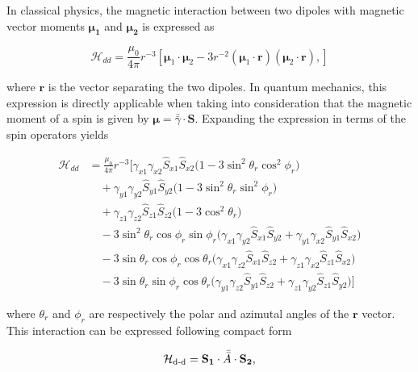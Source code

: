 In classical physics, the magnetic interaction between two dipoles with magnetic vector moments $\boldsymbol{\mu_1}$ and $\boldsymbol{\mu_2}$ is expressed as

\begin{equation}
    \mathcal{H}_{dd} = \frac{\mu_0}{4\pi} r^{-3} 
    \left[ \boldsymbol{\mu}_1 \cdot \boldsymbol{\mu}_2 
    - 3r^{-2} (\boldsymbol{\mu}_1 \cdot \mathbf{r})(\boldsymbol{\mu}_2 \cdot \mathbf{r}), \right]
\end{equation}

\noindent where $\mathbf{r}$ is the vector separating the two dipoles. In quantum mechanics, this expression is directly applicable when taking into consideration that the magnetic moment of a spin is given by $\boldsymbol{\mu} = \bar{\bar{\gamma}} \cdot \mathbf{S}$. Expanding the expression in terms of the spin operators yields

\begin{equation}
\begin{aligned}
\mathcal{H}_{dd} &= 
\frac{\mu_0}{4\pi} r^{-3} \Big[ 
\gamma_{x1}\gamma_{x2} \hat{S}_{x1} \hat{S}_{x2} \big( 1 - 3 \sin^2 \theta_r \cos^2 \phi_r \big) \\
&\quad + \gamma_{y1}\gamma_{y2} \hat{S}_{y1} \hat{S}_{y2} \big( 1 - 3 \sin^2 \theta_r \sin^2 \phi_r \big) \\
&\quad + \gamma_{z1}\gamma_{z2} \hat{S}_{z1} \hat{S}_{z2} \big( 1 - 3 \cos^2 \theta_r \big) \\
&\quad - 3 \sin^2 \theta_r \cos \phi_r \sin \phi_r 
\big( \gamma_{x1}\gamma_{y2} \hat{S}_{x1} \hat{S}_{y2} + \gamma_{y1}\gamma_{x2} \hat{S}_{y1} \hat{S}_{x2} \big) \\
&\quad - 3 \sin \theta_r \cos \phi_r \cos \theta_r 
\big( \gamma_{x1}\gamma_{z2} \hat{S}_{x1} \hat{S}_{z2} + \gamma_{z1}\gamma_{x2} \hat{S}_{z1} \hat{S}_{x2} \big) \\
&\quad - 3 \sin \theta_r \sin \phi_r \cos \theta_r 
\big( \gamma_{y1}\gamma_{z2} \hat{S}_{y1} \hat{S}_{z2} + \gamma_{z1}\gamma_{y2} \hat{S}_{z1} \hat{S}_{y2} \big) 
\Big]
\end{aligned}
\end{equation}

\noindent where $\theta_r$ and $\phi_r$ are respectively the polar and azimutal angles of the $\mathbf{r}$ vector. This interaction can be expressed following compact form

\begin{equation}
    \mathcal{H}_{\text{d-d}} = \mathbf{S_1} \cdot \bar{\bar {A}} \cdot \mathbf{S_2},
\end{equation}

